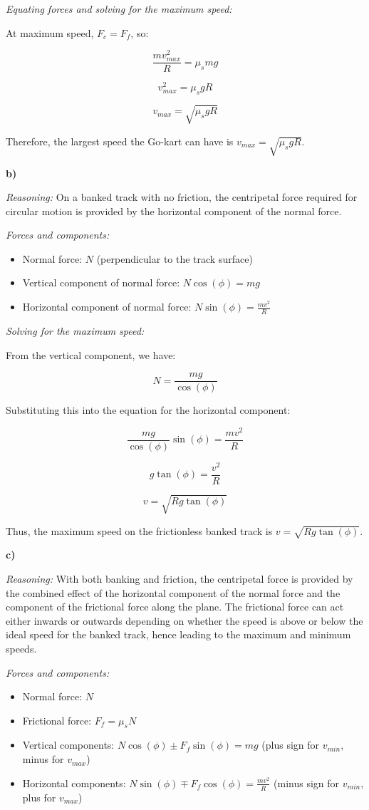 \documentclass{article}
\begin{document}
\textit{Equating forces and solving for the maximum speed:}

At maximum speed, $F_c = F_f$, so:

$$ \frac{mv_{max}^2}{R} = \mu_s mg $$

$$ v_{max}^2 = \mu_s g R $$

$$ v_{max} = \sqrt{\mu_s g R} $$

Therefore, the largest speed the Go-kart can have is $v_{max} = \sqrt{\mu_s g R}$.

\textbf{b)}

\textit{Reasoning:} On a banked track with no friction, the centripetal force required for circular motion is provided by the horizontal component of the normal force.

\textit{Forces and components:}
\begin{itemize}
    \item Normal force: $N$ (perpendicular to the track surface)
    \item Vertical component of normal force: $N\cos(\phi) = mg$
    \item Horizontal component of normal force: $N\sin(\phi) = \frac{mv^2}{R}$
\end{itemize}

\textit{Solving for the maximum speed:}

From the vertical component, we have:

$$ N = \frac{mg}{\cos(\phi)} $$

Substituting this into the equation for the horizontal component:

$$ \frac{mg}{\cos(\phi)}\sin(\phi) = \frac{mv^2}{R} $$

$$ g\tan(\phi) = \frac{v^2}{R} $$

$$ v = \sqrt{Rg\tan(\phi)} $$

Thus, the maximum speed on the frictionless banked track is $v = \sqrt{Rg\tan(\phi)}$.

\textbf{c)}

\textit{Reasoning:} With both banking and friction, the centripetal force is provided by the combined effect of the horizontal component of the normal force and the component of the frictional force along the plane. The frictional force can act either inwards or outwards depending on whether the speed is above or below the ideal speed for the banked track, hence leading to the maximum and minimum speeds.

\textit{Forces and components:}
\begin{itemize}
    \item Normal force: $N$
    \item Frictional force: $F_f = \mu_s N$
    \item Vertical components: $N\cos(\phi) \pm F_f\sin(\phi) = mg$ (plus sign for $v_{min}$, minus for $v_{max}$)
    \item Horizontal components: $N\sin(\phi) \mp F_f\cos(\phi) = \frac{mv^2}{R}$ (minus sign for $v_{min}$, plus for $v_{max}$)
\end{itemize}
\end{document}
